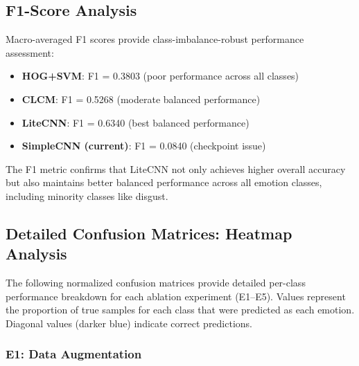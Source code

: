 \documentclass[12pt,a4paper]{article}
\begin{document}
\subsection{F1-Score Analysis}
Macro-averaged F1 scores provide class-imbalance-robust performance assessment:

\begin{itemize}[leftmargin=*]
    \item \textbf{HOG+SVM}: F1 = 0.3803 (poor performance across all classes)
    \item \textbf{CLCM}: F1 = 0.5268 (moderate balanced performance)
    \item \textbf{LiteCNN}: F1 = 0.6340 (best balanced performance)
    \item \textbf{SimpleCNN (current)}: F1 = 0.0840 (checkpoint issue)
\end{itemize}

The F1 metric confirms that LiteCNN not only achieves higher overall accuracy but also maintains better balanced performance across all emotion classes, including minority classes like disgust.

\subsection{Detailed Confusion Matrices: Heatmap Analysis}

The following normalized confusion matrices provide detailed per-class performance breakdown for each ablation experiment (E1--E5). Values represent the proportion of true samples for each class that were predicted as each emotion. Diagonal values (darker blue) indicate correct predictions.

\subsubsection{E1: Data Augmentation}
\end{document}
